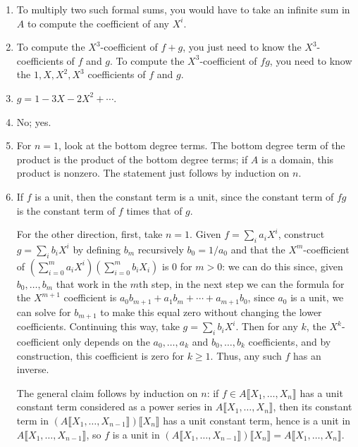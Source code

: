 \documentclass[12pt]{amsart}
\newcommand{\solution}[1]{\ifthenelse {\equal{\displaysol}{1}} {\begin{framed}{\color{meretale}\noindent #1}\end{framed}} { \ }}
\newcommand\itema{\stepcounter{enumii}\item[{\bf{(\theenumii)}}]}
\begin{document}
\begin{enumerate}
\begin{samepage}
\begin{enumerate}
\end{enumerate}
\end{samepage}

\solution{
\begin{enumerate}
\itema To multiply two such formal sums, you would have to take an infinite sum in $A$ to compute the coefficient of any $X^i$.
\itema To compute the $X^3$-coefficient of $f+g$, you just need to know the $X^3$-coefficients of $f$ and $g$. To compute the $X^3$-coefficient of $fg$, you need to know the $1, X, X^2, X^3$ coefficients of $f$ and $g$.
\itema $g= 1 - 3X - 2X^2 + \cdots$.
\itema No; yes.
\itema For $n=1$, look at the bottom degree terms. The bottom degree term of the product is the product of the bottom degree terms; if $A$ is a domain, this product is nonzero. The statement just follows by induction on $n$.
\itema If $f$ is a unit, then the constant term is a unit, since the constant term of $fg$ is the constant term of $f$ times that of $g$. 

For the other direction, first, take $n=1$.  Given $f=\sum_i a_i X^i$, construct $g=\sum_i b_i X^i$ by defining $b_m$ recursively $b_0=1/a_0$ and that the $X^m$-coefficient of $(\sum_{i=0}^m a_i X^i)(\sum_{i=0}^m b_i X_i)$ is $0$ for $m>0$: we can do this since, given $b_0,\dots,b_m$ that work in the $m$th step, in the next step we can the formula for the $X^{m+1}$ coefficient is $a_0 b_{m+1} + a_1 b_m + \cdots + a_{m+1} b_0$, since $a_0$ is a unit, we can solve for $b_{m+1}$ to make this equal zero without changing the lower coefficients. Continuing this way, take $g= \sum_i b_i X^i$. Then  for any $k$, the $X^k$-coefficient only depends on the $a_0,\dots,a_k$ and $b_0,\dots,b_k$ coefficients, and by construction, this coefficient is zero for $k\geq 1$. Thus, any such $f$ has an inverse.

The general claim follows by induction on $n$: if $f\in A\llbracket X_1,\dots,X_n \rrbracket$ has a unit constant term considered as a power series in $A\llbracket X_1,\dots,X_n \rrbracket$, then its constant term in  $(A\llbracket X_1,\dots,X_{n-1} \rrbracket) \llbracket X_n \rrbracket$ has a unit constant term, hence is a unit in $A\llbracket X_1,\dots,X_{n-1} \rrbracket$, so $f$ is a unit in $(A\llbracket X_1,\dots,X_{n-1} \rrbracket) \llbracket X_n \rrbracket = A\llbracket X_1,\dots,X_n \rrbracket$.
\end{enumerate}
}





\end{enumerate}
\end{document}

